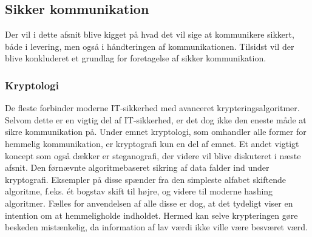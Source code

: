 \subsection{Sikker kommunikation}
Der vil i dette afsnit blive kigget på hvad det vil sige at kommunikere sikkert, både i levering, men også i håndteringen af kommunikationen. Tilsidst vil der blive konkluderet et grundlag for foretagelse af sikker kommunikation.

\subsubsection{Kryptologi}
De fleste forbinder moderne IT-sikkerhed med avanceret krypteringsalgoritmer. Selvom dette er en vigtig del af IT-sikkerhed, er det dog ikke den eneste måde at sikre kommunikation på. Under emnet kryptologi, som omhandler alle former for hemmelig kommunikation, er kryptografi kun en del af emnet. Et andet vigtigt koncept som også dækker er steganografi, der videre vil blive diskuteret i næste afsnit. Den førnævnte algoritmebaseret sikring af data falder ind under kryptografi. Eksempler på disse spænder fra den simpleste alfabet skiftende algoritme, f.eks. ét bogstav skift til højre, og videre til moderne hashing algoritmer. Fælles for anvendelsen af alle disse er dog, at det tydeligt viser en intention om at hemmeligholde indholdet. Hermed kan selve krypteringen gøre beskeden mistænkelig, da information af lav værdi ikke ville være besværet værd.

